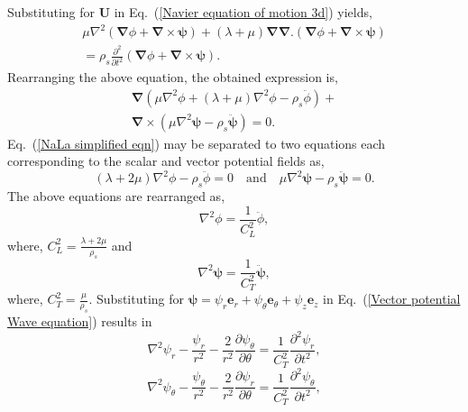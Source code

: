 \documentclass[10pt]{asme2ej}
\begin{document}

Substituting for $\mathbf{U}$ in Eq.~(\ref{Navier equation of motion 3d}) yields,
\begin{multline}
    \mu\nabla^{2}(\pmb{\nabla}\phi+\pmb{\nabla}\times\pmb{\psi})+(\lambda+\mu)\pmb{\nabla}\pmb{\nabla}.(\pmb{\nabla}\phi+\pmb{\nabla}\times\pmb{\psi})\\ = \rho_s\frac{\partial^{2}}{\partial t^{2}}(\pmb{\nabla}\phi+\pmb{\nabla}\times\pmb{\psi}).
\end{multline}
Rearranging the above equation, the obtained expression is,
\begin{multline}\label{NaLa simplified eqn}
    \pmb{\nabla}(\mu\nabla^{2}\phi+(\lambda+\mu)\nabla^{2}\phi-\rho_s\ddot{{\phi}})+\\ \pmb{\nabla}\times(\mu\nabla^{2}\pmb{\psi}-\rho_s\ddot{\pmb{\psi}}) = 0.
\end{multline}
Eq.~(\ref{NaLa simplified eqn}) may be separated to two equations each corresponding to the scalar and vector potential fields as,
\begin{equation*}
    (\lambda+2\mu)\nabla^{2}\phi-\rho_s\ddot{\phi} = 0 \hspace{1em} \text{and} \hspace{1em} \mu\nabla^{2}\pmb{\psi}-\rho_s\ddot{\pmb{\psi}} = 0.
\end{equation*}
The above equations are rearranged as,
\begin{equation}\label{Scalar potential Wave equation}
    \nabla^{2}\phi = \frac{1}{C_{L}^{2}}\ddot{\phi},
\end{equation}
where, $C_{L}^{2} = \frac{\lambda+2\mu}{\rho_s}$ and
\begin{equation}\label{Vector potential Wave equation}
    \nabla^{2}\pmb{\psi} = \frac{1}{C_{T}^{2}}\ddot{\pmb{\psi}},
\end{equation}
where, $C_{T}^{2} = \frac{\mu}{\rho_s}$.
Substituting for $\pmb{\psi} = \psi_r\mathbf{e}_r + \psi_\theta\mathbf{e}_\theta + \psi_z\mathbf{e}_z$ in Eq.~(\ref{Vector potential Wave equation}) results in~\cite{achenbach2012}
 \begin{equation}\label{Vector equation of r}
     \nabla^{2}\psi_{r}-\frac{\psi_{r}}{r^{2}}-\frac{2}{r^{2}}\frac{\partial\psi_{\theta}}{\partial\theta} = \frac{1}{C_T^{2}}\frac{\partial^{2}\psi_{r}}{\partial t^{2}},
 \end{equation}
  \begin{equation}\label{vector equation of theta}
     \nabla^{2}\psi_{\theta}-\frac{\psi_{\theta}}{r^{2}}-\frac{2}{r^{2}}\frac{\partial\psi_{r}}{\partial\theta} = \frac{1}{C_T^{2}}\frac{\partial^{2}\psi_{\theta}}{\partial t^{2}},
 \end{equation}
\end{document}
